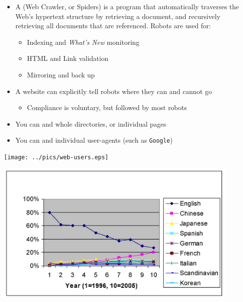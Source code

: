 \documentclass[a4paper,landscape,headrule,footrule,xetex]{foils}
\begin{document}
\begin{itemize}
\item A  (Web Crawler, or Spiders) is a program that
  automatically traverses the Web's hypertext structure by retrieving
  a document, and recursively retrieving all documents that are
  referenced. Robots are used for:
  \begin{itemize}
  \item Indexing and \textit{What's New} monitoring
  \item HTML and Link validation
  \item Mirroring and back up
  \end{itemize}
\item A website can explicitly tell robots where they can and cannot go
  \begin{itemize}
  \item Compliance is voluntary, but followed by most robots
  \end{itemize}
\item You can  and  whole directories, or individual pages
\item You can  and  individual user-agents
  (such as \texttt{Google})
\end{itemize}


\MyLogo{}
\begin{center}
  \texttt{[image: ../pics/web-users.eps]}
\end{center}

\begin{center}
  \includegraphics[width=0.9\textwidth]{../pics/gerrand.fig5.jpg}
\end{center}
\end{document}
